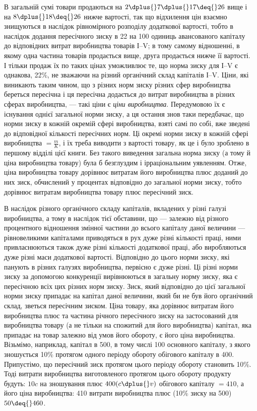 \noindent{}В загальній сумі товари продаються на $2 \dplus{} 7 \dplus{} 17 \deq{} 26$ вище і
на $8 \dplus{} 18 \deq{} 26$ нижче вартості, так що відхилення цін взаємно
знищуються в наслідок рівномірного розподілу додаткової вартості, тобто в наслідок додання
пересічного зиску в 22 на
100 одиниць авансованого капіталу до відповідних витрат виробництва товарів І--V; в тому самому
відношенні, в якому одна
частина товарів продається вище, друга продається нижче її
вартості. І тільки продаж їх по таких цінах уможливлює те, що
норма зиску для І--V є однакова, 22\%, не зважаючи на різний
органічний склад капіталів І--V. Ціни, які виникають таким чином, що з різних норм зиску різних сфер
виробництва береться
пересічна і ця пересічна додається до витрат виробництва в різних сферах виробництва, — такі ціни є
\emph{ціни виробництва}. Передумовою їх є існування однієї загальної норми зиску, а ця
остання знов таки передбачає, що норми зиску в кожній окремій сфері виробництва, взяті самі по собі,
вже зведені до
відповідної кількості пересічних норм. Ці окремі норми зиску в кожній сфері виробництва $= \frac{m}{K}$, і їх
треба виводити з вартості товару, як це і було зроблено в першому відділі цієї книги. Без такого
виведення загальна норма зиску (а тому й ціна виробництва товару) була б безглуздим і ірраціональним
уявленням. Отже, ціна виробництва товару дорівнює витратам його
виробництва плюс доданий до них зиск, обчислений у процентах
відповідно до загальної норми зиску, тобто дорівнює витратам
виробництва товару плюс пересічний зиск.

В наслідок різного органічного складу капіталів, вкладених
у різні галузі виробництва, а тому в наслідок тієї обставини,
що — залежно від різного процентного відношення змінної частини до всього капіталу даної величини —
рівновеликими капіталами приводяться в рух дуже різні кількості праці, ними привласнюються також
дуже різні кількості додаткової праці, або
виробляються дуже різні маси додаткової вартості. Відповідно
до цього норми зиску, які панують в різних галузях виробництва,
первісно є дуже різні. Ці різні норми зиску за допомогою конкуренції вирівнюються в загальну
норму зиску, яка
є пересічною всіх цих різних норм зиску. Зиск, який відповідно
до цієї загальної норми зиску припадає на капітал даної величини, який би не був його органічний
склад, зветься пересічним
зиском. Ціна товару, яка дорівнює витратам його виробництва
плюс та частина річного пересічного зиску на застосований для
виробництва товару (а не тільки на спожитий для його виробництва) капітал, яка припадає на товар
залежно від умов його
обороту, є його ціна виробництва. Візьмімо, наприклад, капітал
в 500, в тому числі 100 основного капіталу, з якого зношується
10\% протягом одного періоду обороту обігового капіталу в 400.
Припустімо, що пересічний зиск протягом цього періоду обороту становить 10\%. Тоді витрати
виробництва виготовленого
протягом цього обороту продукту будуть: $10 c$ на зношування
плюс $400 (c \dplus{} v)$ обігового капіталу $= 410$, а його ціна виробництва: 410 витрати виробництва плюс
(10\% зиску на 500) $50 \deq{} 460$.

